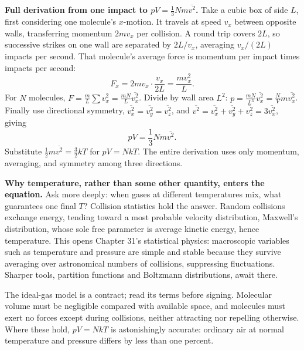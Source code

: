 \begin{mathbridge}
\textbf{Full derivation from one impact to \(pV=\frac{1}{3}Nm\overline{v^2}\).} Take a cubic box of side \(L\), first considering one molecule's \(x\)-motion. It travels at speed \(v_x\) between opposite walls, transferring momentum \(2mv_x\) per collision. A round trip covers \(2L\), so successive strikes on one wall are separated by \(2L/v_x\), averaging \(v_x/(2L)\) impacts per second. That molecule's average force is momentum per impact times impacts per second:
\[
F_x = 2mv_x \cdot \frac{v_x}{2L} = \frac{mv_x^2}{L}.
\]
For \(N\) molecules, \(F = \frac{m}{L}\sum v_x^2 = \frac{mN}{L}\overline{v_x^2}\). Divide by wall area \(L^2\): \(p = \frac{mN}{L^3}\overline{v_x^2} = \frac{N}{V}m\overline{v_x^2}\). Finally use directional symmetry, \(\overline{v_x^2}=\overline{v_y^2}=\overline{v_z^2}\), and \(\overline{v^2}=\overline{v_x^2}+\overline{v_y^2}+\overline{v_z^2}=3\overline{v_x^2}\), giving
\[
pV = \frac{1}{3}Nm\overline{v^2}.
\]
Substitute \(\frac{1}{2}m\overline{v^2}=\frac{3}{2}kT\) for \(pV=NkT\). The entire derivation uses only momentum, averaging, and symmetry among three directions.
\end{mathbridge}

\begin{challenge}
\textbf{Why temperature, rather than some other quantity, enters the equation.} Ask more deeply: when gases at different temperatures mix, what guarantees one final \(T\)? Collision statistics hold the answer. Random collisions exchange energy, tending toward a most probable velocity distribution, Maxwell's distribution, whose sole free parameter is average kinetic energy, hence temperature. This opens Chapter 31's statistical physics: macroscopic variables such as temperature and pressure are simple and stable because they survive averaging over astronomical numbers of collisions, suppressing fluctuations. Sharper tools, partition functions and Boltzmann distributions, await there.
\end{challenge}


The ideal-gas model is a contract; read its terms before signing. Molecular volume must be negligible compared with available space, and molecules must exert no forces except during collisions, neither attracting nor repelling otherwise. Where these hold, \(pV=NkT\) is astonishingly accurate: ordinary air at normal temperature and pressure differs by less than one percent.

